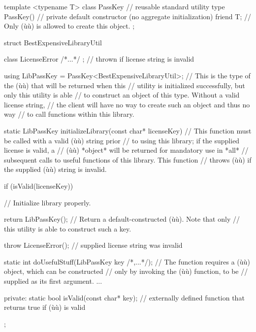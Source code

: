 \begin{emcppslisting}
template <typename T>
class PassKey  // reusable standard utility type
{
    PassKey() { }  // private default constructor (no aggregate initialization)
    friend T;      // Only (ù{}ù) is allowed to create this object.
};

struct BestExpensiveLibraryUtil
{
    class LicenseError { /*...*/ };  // thrown if license string is invalid

    using LibPassKey = PassKey<BestExpensiveLibraryUtil>;
        // This is the type of the (ù{}ù) that will be returned when this
        // utility is initialized successfully, but only this utility is able 
        // to construct an object of this type. Without a valid license string,
        // the client will have no way to create such an object and thus no way
        // to call functions within this library.

    static LibPassKey initializeLibrary(const char* licenseKey)
        // This function must be called with a valid (ù{}ù) string prior
        // to using this library; if the supplied license is valid, a
        // (ù{}ù) *object* will be returned for mandatory use in *all*
        // subsequent calls to useful functions of this library. This function
        // throws (ù{}ù) if the supplied (ù{}ù) string is invalid.
    {
        if (isValid(licenseKey))
        {
            // Initialize library properly.

            return LibPassKey();
                // Return a default-constructed (ù{}ù). Note that only
                // this utility is able to construct such a key.
        }

        throw LicenseError();  // supplied license string was invalid
    }

    static int doUsefulStuff(LibPassKey key /*,...*/);
        // The function requires a (ù{}ù) object, which can be constructed
        // only by invoking the (ù{}ù) function, to be
        // supplied as its first argument. ...

private:
    static bool isValid(const char* key);
        // externally defined function that returns true if (ù{}ù) is valid
};
\end{emcppslisting}
    
